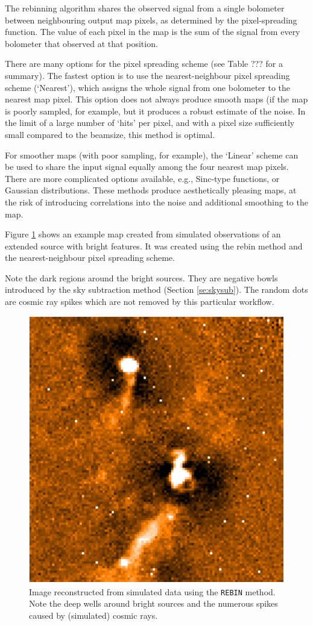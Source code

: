 \documentclass[twoside,11pt]{article}
\renewcommand{\_}{\texttt{\symbol{95}}}
\newcommand{\aparam}[1]{\texttt{#1}}     %
\begin{document}
The rebinning algorithm shares the observed signal from a single
bolometer between neighbouring output map pixels, as determined by the
pixel-spreading function. The value of each pixel in the map is the
sum of the signal from every bolometer that observed at that position.

There are many options for the pixel spreading scheme (see Table ???
for a summary). The fastest option is to use the nearest-neighbour
pixel spreading scheme (`Nearest'), which assigns the whole signal
from one bolometer to the nearest map pixel. This option does not
always produce smooth maps (if the map is poorly sampled, for example,
but it produces a robust estimate of the noise. In the limit of a
large number of `hits' per pixel, and with a pixel size sufficiently
small compared to the beamsize, this method is optimal.

For smoother maps (with poor sampling, for example), the `Linear'
scheme can be used to share the input signal equally among the four
nearest map pixels. There are more complicated options available,
e.g., Sinc-type functions, or Gaussian distributions. These methods
produce aesthetically pleasing maps, at the risk of introducing
correlations into the noise and additional smoothing to the map.

Figure \ref{fig:rebinmap} shows an example map created from simulated
observations of an extended source with bright features. It was
created using the rebin method and the nearest-neighbour pixel
spreading scheme.

Note the dark regions around the bright sources. They are negative
bowls introduced by the sky subtraction method (Section
\ref{se:skysub}). The random dots are cosmic ray spikes which are not
removed by this particular workflow.

\begin{figure}[htb]
  \begin{center}
    \includegraphics[width=0.7\linewidth]{sun258_rebinmap}
    \caption{Image reconstructed from simulated data using the
      \aparam{REBIN} method. Note the deep wells around bright
      sources and the numerous spikes caused by (simulated) cosmic
      rays.}
    \label{fig:rebinmap}
  \end{center}
\end{figure}
\end{document}
